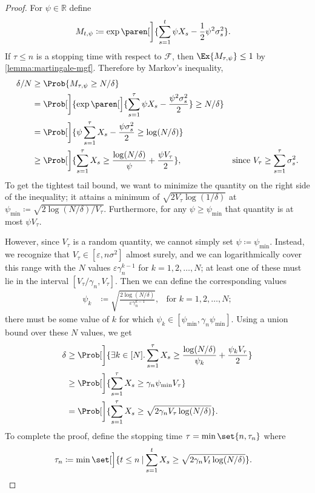 \documentclass{article}
\newcommand{\defeq}{\coloneq}
\newcommand{\Real}{\mathds{R}}
\newcommand\given[1][\delimsize]{%
  \providecommand{\delimsize}{}
  \nonscript\:#1\vert\allowbreak\nonscript\:\mathopen{}
}
\DeclarePairedDelimiter{\paren}()
\begin{document}
\begin{lemma}
  \begin{proof}
    For $\psi\in\Real$ define
    \begin{align*}
      M_{t,\psi} &\defeq \exp\paren[\bigg]{\sum_{s=1}^t \psi X_s - \frac{1}{2}\psi^2\sigma_s^2}.
    \end{align*}
    If $\tau \le n$ is a stopping time with respect to $\mathcal{F}$,
    then $\Ex{M_{\tau,\psi}} \le 1$ by \cref{lemma:martingale-mgf}.
    Therefore by Markov's inequality,
    \begin{align*}
      \delta/N
      &\ge \Prob{M_{\tau,\psi} \ge N/\delta} \\
      &= \Prob[\bigg]{\exp\paren[\Big]{\sum_{s=1}^\tau \psi X_s - \frac{\psi^2\sigma_s^2}{2}} \ge N/\delta} \\
      &= \Prob[\bigg]{\psi \sum_{s=1}^\tau X_s - \frac{\psi\sigma_s^2}{2} \ge \log(N/\delta)} \\
      &\ge \Prob[\bigg]{\sum_{s=1}^\tau X_s \ge \frac{\log(N/\delta)}{\psi} + \frac{\psi V_\tau}{2}},
      &\text{since } V_\tau \ge \sum_{s=1}^\tau \sigma_s^2.
    \end{align*}
    To get the tightest tail bound, we want to minimize the quantity
    on the right side of the inequality; it attains a minimum of
    $\sqrt{2V_\tau \log(1/\delta)}$ at
    $\psi_{\min} \defeq \sqrt{2\log(N/\delta)/V_\tau}$.  Furthermore,
    for any $\psi\ge\psi_{\min}$ that quantity is at most
    $\psi V_\tau$.

    However, since $V_\tau$ is a random quantity, we cannot simply set
    $\psi \defeq \psi_{\min}$.  Instead, we recognize that
    $V_\tau \in [\varepsilon, n\sigma^2]$ almost surely, and we can
    logarithmically cover this range with the $N$ values
    $\varepsilon\gamma_n^{k-1}$ for $k=1,2,\dotsc,N$; at least one of
    these must lie in the interval $[V_\tau/\gamma_n, V_\tau]$.  Then
    we can define the corresponding values
    \begin{align*}
      \psi_k &\defeq \sqrt{\frac{2\log(N/\delta)}{\varepsilon\gamma_n^{k-1}}},
              &\text{for } k=1,2,\dotsc,N;
    \end{align*}
    there must be some value of $k$ for which
    $\psi_k \in [\psi_{\min}, \gamma_n\psi_{\min}]$.  Using a union bound
    over these $N$ values, we get
    \begin{align*}
      \delta
      &\ge \Prob[\bigg]{\exists k\in[N]. \sum_{s=1}^\tau X_s \ge \frac{\log(N/\delta)}{\psi_k} + \frac{\psi_k V_\tau}{2}} \\
      &\ge \Prob[\bigg]{\sum_{s=1}^\tau X_s \ge \gamma_n\psi_{\min}V_\tau} \\
      &= \Prob[\bigg]{\sum_{s=1}^\tau X_s \ge \sqrt{2\gamma_nV_\tau\log(N/\delta)}}.
    \end{align*}
    To complete the proof, define the stopping time $\tau =
    \min\set{n,\tau_n}$ where
    \begin{align*}
      \tau_n &\defeq \min\set[\Big]{t \le n \given \sum_{s=1}^tX_s \ge \sqrt{2\gamma_nV_t\log(N/\delta)}}.
              \qedhere
    \end{align*}
  \end{proof}
\end{lemma}
\end{document}
